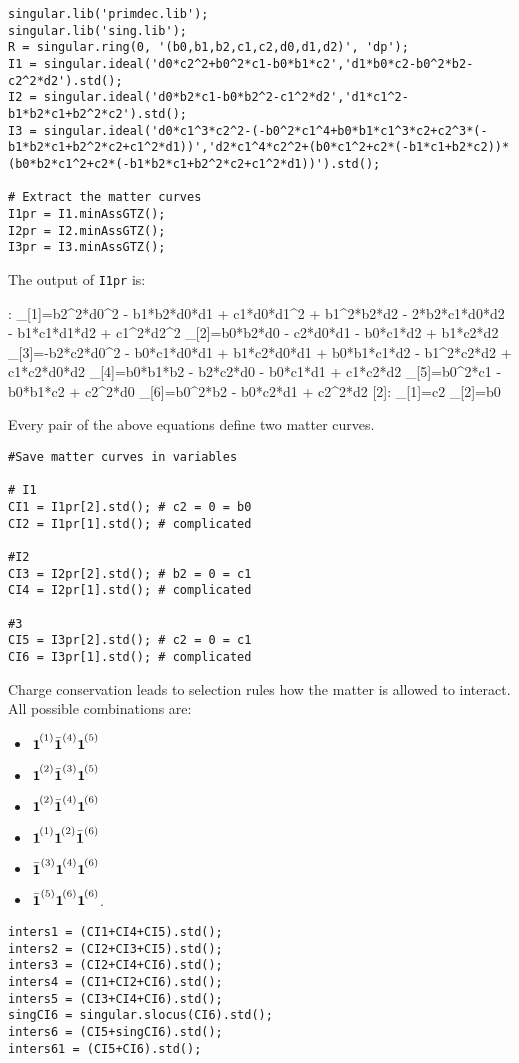 \documentclass[11pt,a4paper,english]{scrartcl}
\newcommand\mc[1]{{\vphantom{\bar{\boldsymbol{1}}}\boldsymbol{1}}^{\mkern-2mu (#1)}}
\newcommand{\mcb}[1]{\bar{\boldsymbol{1}}^{(#1)}}
\newcommand{\ya}{\mc{1}\mcb{4}\mc{5}}
\newcommand{\yb}{\mc{2}\mcb{3}\mc{5}}
\newcommand{\yc}{\mc{2}\mcb{4}\mc{6}}
\newcommand{\yd}{\mc{1}\mc{2}\mcb{6}}
\newcommand{\ye}{\mcb{3}\mc{4}\mc{6}}
\newcommand{\yfs}{\mcb{5}\mc{6}\mc{6}}
\begin{document}
\begin{lstlisting}
singular.lib('primdec.lib');
singular.lib('sing.lib');
R = singular.ring(0, '(b0,b1,b2,c1,c2,d0,d1,d2)', 'dp');
I1 = singular.ideal('d0*c2^2+b0^2*c1-b0*b1*c2','d1*b0*c2-b0^2*b2-c2^2*d2').std();
I2 = singular.ideal('d0*b2*c1-b0*b2^2-c1^2*d2','d1*c1^2-b1*b2*c1+b2^2*c2').std();
I3 = singular.ideal('d0*c1^3*c2^2-(-b0^2*c1^4+b0*b1*c1^3*c2+c2^3*(-b1*b2*c1+b2^2*c2+c1^2*d1))','d2*c1^4*c2^2+(b0*c1^2+c2*(-b1*c1+b2*c2))*(b0*b2*c1^2+c2*(-b1*b2*c1+b2^2*c2+c1^2*d1))').std();

# Extract the matter curves
I1pr = I1.minAssGTZ();
I2pr = I2.minAssGTZ();
I3pr = I3.minAssGTZ();
\end{lstlisting}
The output of \verb|I1pr| is:
\begin{spverbatim}
[1]:
   _[1]=b2^2*d0^2 - b1*b2*d0*d1 + c1*d0*d1^2 + b1^2*b2*d2 - 2*b2*c1*d0*d2 
- b1*c1*d1*d2 + c1^2*d2^2
   _[2]=b0*b2*d0 - c2*d0*d1 - b0*c1*d2 + b1*c2*d2
   _[3]=-b2*c2*d0^2 - b0*c1*d0*d1 + b1*c2*d0*d1 + b0*b1*c1*d2 - b1^2*c2*d2
+ c1*c2*d0*d2
   _[4]=b0*b1*b2 - b2*c2*d0 - b0*c1*d1 + c1*c2*d2
   _[5]=b0^2*c1 - b0*b1*c2 + c2^2*d0
   _[6]=b0^2*b2 - b0*c2*d1 + c2^2*d2
[2]:
   _[1]=c2
   _[2]=b0
\end{spverbatim}

Every pair of the above equations define two matter curves.
\begin{lstlisting}
#Save matter curves in variables

# I1
CI1 = I1pr[2].std(); # c2 = 0 = b0
CI2 = I1pr[1].std(); # complicated

#I2
CI3 = I2pr[2].std(); # b2 = 0 = c1
CI4 = I2pr[1].std(); # complicated

#3
CI5 = I3pr[2].std(); # c2 = 0 = c1
CI6 = I3pr[1].std(); # complicated
\end{lstlisting}



Charge conservation leads to selection rules how the matter is allowed to interact. All possible combinations are:
\begin{itemize}
\item $\ya$
\item $\yb$
\item  $\yc$
\item $\yd$
\item $\ye$
\item $\yfs$.
\end{itemize}

\begin{lstlisting}
inters1 = (CI1+CI4+CI5).std();
inters2 = (CI2+CI3+CI5).std();
inters3 = (CI2+CI4+CI6).std();
inters4 = (CI1+CI2+CI6).std();
inters5 = (CI3+CI4+CI6).std();
singCI6 = singular.slocus(CI6).std();
inters6 = (CI5+singCI6).std();
inters61 = (CI5+CI6).std();
\end{lstlisting}
\end{document}
